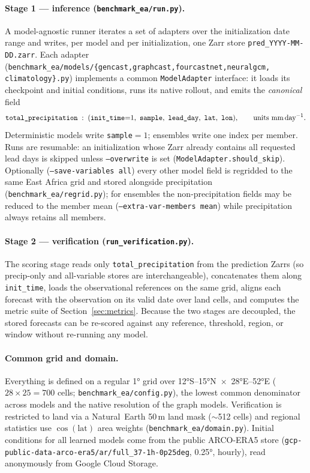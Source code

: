 \documentclass[11pt]{article}
\newcommand{\code}[1]{\texttt{\small #1}}
\newcommand{\mmday}{mm\,day$^{-1}$}
\begin{document}
\paragraph{Stage 1 --- inference (\code{benchmark\_ea/run.py}).}
A model-agnostic runner iterates a set of adapters over the initialization date
range and writes, per model and per initialization, one Zarr store
\code{pred\_YYYY-MM-DD.zarr}. Each adapter
(\code{benchmark\_ea/models/\{gencast,graphcast,fourcastnet,neuralgcm,%
climatology\}.py}) implements a common \code{ModelAdapter} interface: it loads
its checkpoint and initial conditions, runs its native rollout, and emits the
\emph{canonical} field
\[
  \texttt{total\_precipitation}\;:\;
  (\texttt{init\_time}{=}1,\ \texttt{sample},\ \texttt{lead\_day},\
   \texttt{lat},\ \texttt{lon}),\qquad \text{units \mmday}.
\]
Deterministic models write \code{sample}${=}1$; ensembles write one index per
member. Runs are resumable: an initialization whose Zarr already contains all
requested lead days is skipped unless \code{--overwrite} is set
(\code{ModelAdapter.should\_skip}). Optionally (\code{--save-variables all})
every other model field is regridded to the same East Africa grid and stored
alongside precipitation (\code{benchmark\_ea/regrid.py}); for ensembles the
non-precipitation fields may be reduced to the member mean
(\code{--extra-var-members mean}) while precipitation always retains all members.

\paragraph{Stage 2 --- verification (\code{run\_verification.py}).}
The scoring stage reads only \code{total\_precipitation} from the prediction
Zarrs (so precip-only and all-variable stores are interchangeable), concatenates
them along \code{init\_time}, loads the observational references on the same
grid, aligns each forecast with the observation on its valid date over land
cells, and computes the metric suite of Section~\ref{sec:metrics}. Because the
two stages are decoupled, the stored forecasts can be re-scored against any
reference, threshold, region, or window without re-running any model.

\paragraph{Common grid and domain.}
Everything is defined on a regular \ang{1} grid over
\ang{12}S--\ang{15}N~$\times$~\ang{28}E--\ang{52}E ($28\times25=700$ cells;
\code{benchmark\_ea/config.py}), the lowest common denominator across models and
the native resolution of the graph models. Verification is restricted to land
via a Natural~Earth 50\,m land mask ($\sim$512 cells) and regional statistics
use $\cos(\text{lat})$ area weights (\code{benchmark\_ea/domain.py}). Initial
conditions for all learned models come from the public ARCO-ERA5 store
(\code{gcp-public-data-arco-era5/\allowbreak ar/full\_37-1h-0p25deg}, \ang{0.25},
hourly), read anonymously from Google Cloud Storage.
\end{document}
